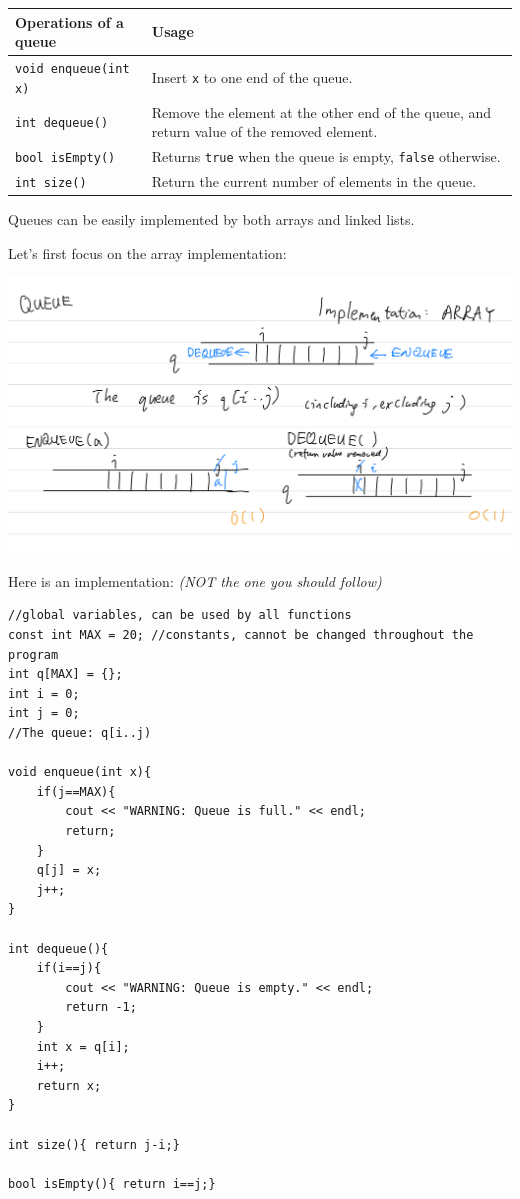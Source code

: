 \begin{table}[h]
    \centering
    \begin{tabular}{|m{11em}|m{24em}|}
        \hline
        \textbf{Operations of a queue} & 
        Usage
        \\ \hline \hline
        
        \texttt{void enqueue(int x)} &
        Insert \texttt{x} to one end of the queue.
        \\ \hline
        
        \texttt{int dequeue()} &
        Remove the element at the other end of the queue, and return value of the removed element.
        \\ \hline
        
        \texttt{bool isEmpty()} &
        Returns \texttt{true} when the queue is empty, \texttt{false} otherwise.
        \\ \hline
        
        \texttt{int size()} &
        Return the current number of elements in the queue.
        \\ \hline
    \end{tabular}
\end{table}

Queues can be easily implemented by both arrays and linked lists.

Let's first focus on the array implementation:

\includegraphics[width=14cm]{images/ch6-qarray.png}

Here is an implementation: \textit{(NOT the one you should follow)}

\begin{lstlisting}
//global variables, can be used by all functions
const int MAX = 20; //constants, cannot be changed throughout the program
int q[MAX] = {};
int i = 0;
int j = 0;
//The queue: q[i..j)

void enqueue(int x){
    if(j==MAX){
        cout << "WARNING: Queue is full." << endl;
        return;
    }
    q[j] = x;
    j++;
}

int dequeue(){
    if(i==j){
        cout << "WARNING: Queue is empty." << endl;
        return -1;
    }
    int x = q[i];
    i++;
    return x;
}

int size(){ return j-i;}

bool isEmpty(){ return i==j;}
\end{lstlisting}

